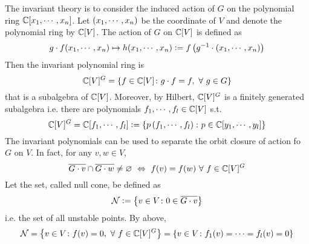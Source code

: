 \documentclass[a4paper,12pt]{article}
\begin{document}
	The invariant theory is to consider the induced action of $G$ on the polynomial ring $\mathbb{C}[x_1,\cdots,x_n]$. Let $\left(x_1,\cdots,x_n\right)$ be the coordinate of $V$ and denote the polynomial ring by $\mathbb{C}[V]$. The action of $G$ on $\mathbb{C}[V]$ is defined as
	\begin{equation*}
		g \cdot f(x_1,\cdots,x_n) \mapsto h(x_1,\cdots,x_n) \vcentcolon= f\left(g^{-1} \cdot (x_1,\cdots,x_n)\right) 
	\end{equation*}
	Then the invariant polynomial ring is
	\begin{equation*}
		\mathbb{C}[V]^G = \left\{f \in \mathbb{C}[V] \colon g \cdot f = f,~\forall~g \in G\right\}
	\end{equation*}
	that is a subalgebra of $\mathbb{C}[V]$. Moreover, by Hilbert, $\mathbb{C}[V]^G$ is a finitely generated subalgebra i.e. there are polynomials $f_1,\cdots,f_l \in \mathbb{C}[V]$ s.t.
	\begin{equation*}
		\mathbb{C}[V]^G = \mathbb{C}[f_1,\cdots,f_l] \vcentcolon= \left\{p\left(f_1,\cdots,f_l\right) \colon p \in \mathbb{C}[y_1,\cdots,y_l]\right\}
	\end{equation*}
	The invariant polynomials can be used to separate the orbit closure of action fo $G$ on $V$. In fact, for any $v,w \in V$,
	\begin{equation*}
		\overline{G \cdot v} \cap \overline{G \cdot w} \neq \varnothing ~\Leftrightarrow~ f(v) = f(w)~\forall~f \in \mathbb{C}[V]^G
	\end{equation*}
	Let the set, called null cone, be defined as
	\begin{equation*}
		\mathcal{N} \vcentcolon= \left\{v \in V \colon 0 \in \overline{G \cdot v}\right\}
	\end{equation*}
	i.e. the set of all unstable points. By above,
	\begin{equation*}
		\mathcal{N} = \left\{v \in V \colon f(v) = 0,~\forall~f \in \mathbb{C}[V]^G\right\}  = \left\{v \in V \colon f_1(v)=\cdots=f_l(v) = 0\right\}
	\end{equation*}
\end{document}
